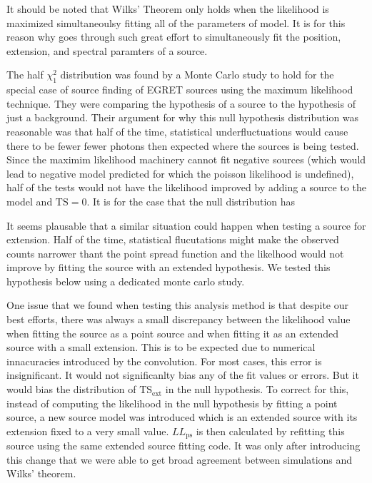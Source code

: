 \documentclass[preprint]{aastex}
\newcommand{\tsext}{{\ensuremath{\text{TS}_\text{ext}}}\xspace}
\newcommand{\ts}{\text{TS}\xspace}
\newcommand{\pointlike}{\text{\em pointlike}\xspace}
\begin{document}
It should be noted that Wilks' Theorem only holds when the likelihood
is maximized simultaneoulsy fitting all of the parameters of model. It
is for this reason why \pointlike goes through such great effort to
simultaneously fit the position, extension, and spectral paramters of
a source.

The half $\chi^2_1$ distribution was found by a Monte Carlo study
to hold for the special case of source finding of EGRET sources using the
maximum likelihood technique.  They were comparing the hypothesis of a
source to the hypothesis of just a background\cite{mattox_egret}.
Their argument for why this null hypothesis distribution was reasonable
was that half of the time, statistical underfluctuations would cause
there to be fewer fewer photons then expected where the sources is being
tested. Since the maximim likelihood machinery cannot fit negative
sources (which would lead to negative model predicted for which the
poisson likelihood is undefined), half of the tests would not have the
likelihood improved by adding a source to the model and $\ts=0$.
It is for the case that the null distribution has 

It seems plausable that a similar situation could happen when testing
a source for extension. Half of the time, statistical flucutations might
make the observed counts narrower thant the point spread function and
the likelhood would not improve by fitting the source with an extended
hypothesis. We tested this hypothesis below using a dedicated monte
carlo study.

One issue that we found when testing this analysis method is that
despite our best efforts, there was always a small discrepancy between
the likelihood value when fitting the source as a point source and when
fitting it as an extended source with a small extension.  This is to be
expected due to numerical innacuracies introduced by the convolution.
For most cases, this error is insignificant. It would not significanlty
bias any of the fit values or errors. But it would bias the distribution
of $\tsext$ in the null hypothesis. To correct for this,
instead of computing the likelihood in the null hypothesis by fitting
a point source, a new source model was introduced which is an extended
source with its extension fixed to a very small value. $LL_\text{ps}$
is then calculated by refitting this source using the same extended
source fitting code. It was only after introducing this change that we
were able to get broad agreement between simulations and Wilks' theorem.
\end{document}
